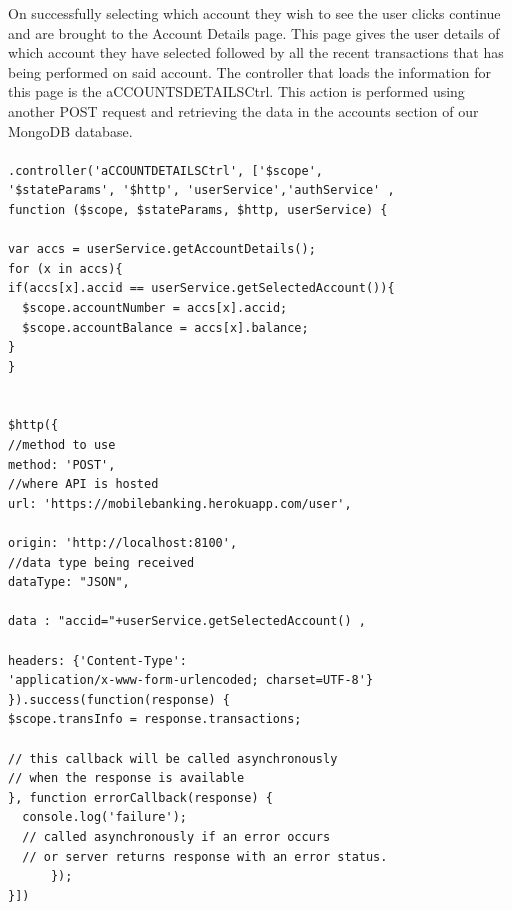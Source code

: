 On successfully selecting which account they wish to see the user clicks continue and are brought to the Account Details page. This page gives the user details of which account they have selected followed by all the recent transactions that has being performed on said account. The controller that loads the information for this page is the aCCOUNTSDETAILSCtrl. This action is performed using another POST request and retrieving the data in the accounts section of our MongoDB database.\paragraph{}
\begin{verbatim}
.controller('aCCOUNTDETAILSCtrl', ['$scope',
'$stateParams', '$http', 'userService','authService' ,
function ($scope, $stateParams, $http, userService) {

var accs = userService.getAccountDetails();
for (x in accs){
if(accs[x].accid == userService.getSelectedAccount()){
  $scope.accountNumber = accs[x].accid;
  $scope.accountBalance = accs[x].balance;
}
}


$http({
//method to use
method: 'POST',
//where API is hosted
url: 'https://mobilebanking.herokuapp.com/user',

origin: 'http://localhost:8100',
//data type being received
dataType: "JSON",

data : "accid="+userService.getSelectedAccount() ,

headers: {'Content-Type':
'application/x-www-form-urlencoded; charset=UTF-8'}
}).success(function(response) {
$scope.transInfo = response.transactions;

// this callback will be called asynchronously
// when the response is available
}, function errorCallback(response) {
  console.log('failure');
  // called asynchronously if an error occurs
  // or server returns response with an error status.
      });
}])
\end{verbatim}


